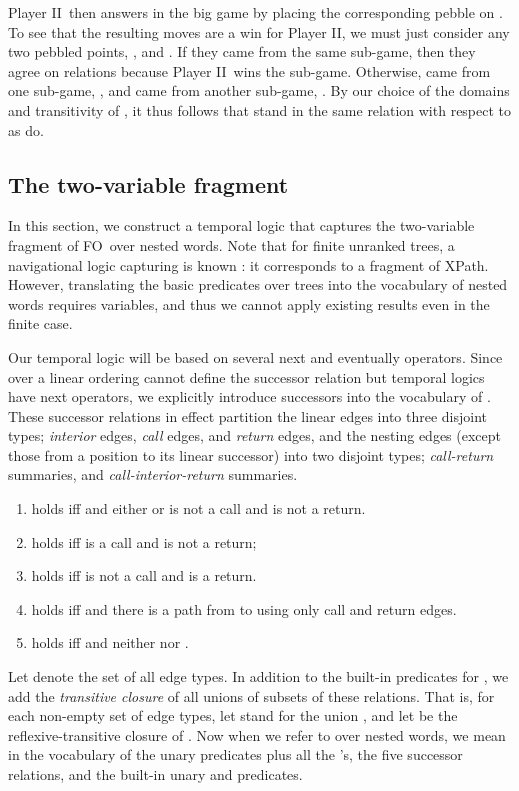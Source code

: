 \documentclass{LMCS}
\newcommand{\dupl}{Player II}
\newcommand{\FO}{{\rm FO}}
\theoremstyle{plain}
\theoremstyle{definition}
\begin{document}
\dupl\ then answers in the big game by placing the corresponding
pebble on .  To see that the resulting moves are a win for \dupl,
we must just consider  any two pebbled points, , and
.  If they came from the same sub-game, then they agree
on relations  because \dupl\ wins the sub-game.  Otherwise,
 came from one sub-game, , and 
 came from another sub-game, .  By our choice of the
domains and transitivity of , it thus follows that 
stand in the same relation with respect to  as  do.





\subsection{The two-variable fragment}
In this section, we construct a temporal logic that captures the two-variable
fragment of \FO\ over nested words. 
Note that for finite unranked trees, a navigational
logic capturing  is known \cite{marx-twovars,marx-tods}: it
corresponds to a fragment of XPath. However, translating the basic
predicates over trees into 
the vocabulary of nested words requires  variables, and thus we
cannot apply existing results even in the finite case. 

Our temporal logic will be based on several next and eventually
operators. 
Since  over a linear ordering cannot define the
successor relation but temporal logics have next operators, we
explicitly introduce successors into the vocabulary of
.  
These successor relations in effect partition the linear edges into three 
disjoint types; {\em interior} edges, {\em call} edges, and {\em return} edges,
and the nesting edges
(except those from a position to its linear successor) into two disjoint types; 
{\em call-return\/} summaries, and {\em call-interior-return\/} summaries.


\begin{enumerate}[]
\item  holds iff  and either  or 
  is not a call and  is not a   return.
\item  holds iff  is a call and  is not a return;
\item  holds iff  is not a call and  is a return.
\item  holds iff  and there is a path from  to  using only
call and return edges.
\item  holds iff  and neither  nor .
\end{enumerate} 

Let  denote the set  of all edge types.
In addition to the built-in predicates  for , we
add the {\em transitive closure} of all unions of subsets 
of these relations.
That is, for each non-empty set  of 
edge types,  let  stand for the union ,
and let  be the reflexive-transitive closure of .
Now when we refer to  over nested words, we mean  in the
 vocabulary of the unary predicates plus all the 's,
the five successor relations, and the built-in unary  and 
predicates. 
\end{document}
